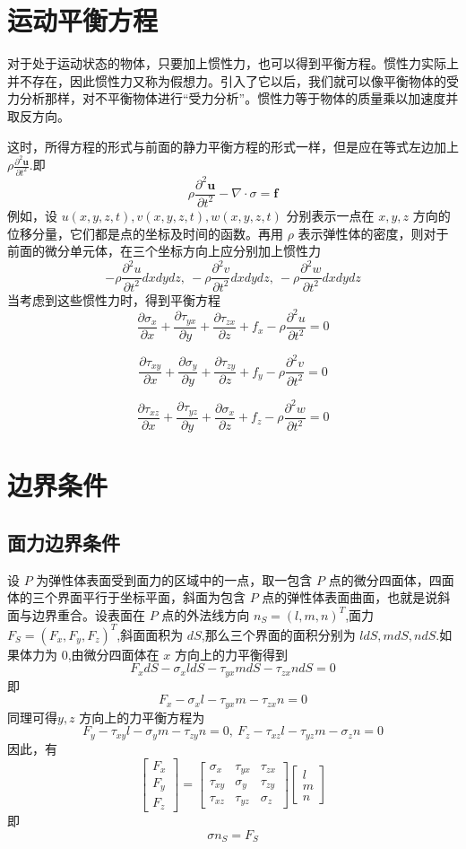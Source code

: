 \documentclass[12pt,a4paper]{article}
\begin{document}
\section{运动平衡方程}
对于处于运动状态的物体，只要加上惯性力，也可以得到平衡方程。惯性力实际上并不存在，因此惯性力又称为假想力。引入了它以后，我们就可以像平衡物体的受力分析那样，对不平衡物体进行“受力分析”。惯性力等于物体的质量乘以加速度并取反方向。

这时，所得方程的形式与前面的静力平衡方程的形式一样，但是应在等式左边加上 $\rho\frac{\partial ^2\textbf{u}}{\partial t^2}$.即
$$
\rho\frac{\partial^2 \textbf{u}}{\partial t^2}-\nabla\cdot \sigma = \textbf{f}
$$
例如，设 $u(x,y,z,t),v(x,y,z,t),w(x,y,z,t)$ 分别表示一点在 $x,y,z$ 方向的位移分量，它们都是点的坐标及时间的函数。再用 $\rho$ 表示弹性体的密度，则对于前面的微分单元体，在三个坐标方向上应分别加上惯性力 
$$-\rho\frac{\partial ^2 u}{\partial t^2}dxdydz,~ -\rho\frac{\partial ^2 v}{\partial t^2}dxdydz,~ -\rho\frac{\partial ^2 w}{\partial t^2}dxdydz
$$
当考虑到这些惯性力时，得到平衡方程
$$
\frac{\partial\sigma_x}{\partial x}+\frac{\partial\tau_{yx}}{\partial y}+\frac{\partial\tau_{zx}}{\partial z}+f_x-\rho\frac{\partial ^2 u}{\partial t^2}=0
$$

$$
\frac{\partial\tau_{xy}}{\partial x}+\frac{\partial\sigma_{y}}{\partial y}+\frac{\partial\tau_{zy}}{\partial z}+f_y-\rho\frac{\partial ^2 v}{\partial t^2}=0
$$

$$
\frac{\partial\tau_{xz}}{\partial x}+\frac{\partial\tau_{yz}}{\partial y}+\frac{\partial\sigma_{x}}{\partial z}+f_z-\rho\frac{\partial ^2 w}{\partial t^2}=0
$$

\section{边界条件}
\subsection{面力边界条件}
设 $P$ 为弹性体表面受到面力的区域中的一点，取一包含 $P$ 点的微分四面体，四面体的三个界面平行于坐标平面，斜面为包含 $P$ 点的弹性体表面曲面，也就是说斜面与边界重合。设表面在 $P$ 点的外法线方向 $n_S=(l,m,n)^T$,面力 $F_S=(F_x,F_y,F_z)^T$,斜面面积为 $dS$,那么三个界面的面积分别为 $ldS,mdS,ndS$.如果体力为 $0$,由微分四面体在 $x$ 方向上的力平衡得到
$$
F_xdS-\sigma_xldS-\tau_{yx}mdS-\tau_{zx}ndS=0
$$
即
$$
F_x-\sigma_xl-\tau_{yx}m-\tau_{zx}n=0
$$
同理可得$y,z$ 方向上的力平衡方程为
$$
F_y-\tau_{xy}l-\sigma_{y}m-\tau_{zy}n=0,~F_z-\tau_{xz}l-\tau_{yz}m-\sigma_{z}n=0
$$
因此，有
$$
\begin{bmatrix}
F_x \\
F_y \\
F_z
\end{bmatrix}=
\begin{bmatrix}
\sigma _x & \tau_{yx} & \tau_{zx} \\
\tau_{xy} & \sigma _y & \tau_{zy} \\
\tau_{xz} & \tau_{yz} & \sigma _z
\end{bmatrix}
\begin{bmatrix}
l \\
m \\
n
\end{bmatrix}
$$
即
$$
\sigma n_S=F_S
$$
\end{document}
